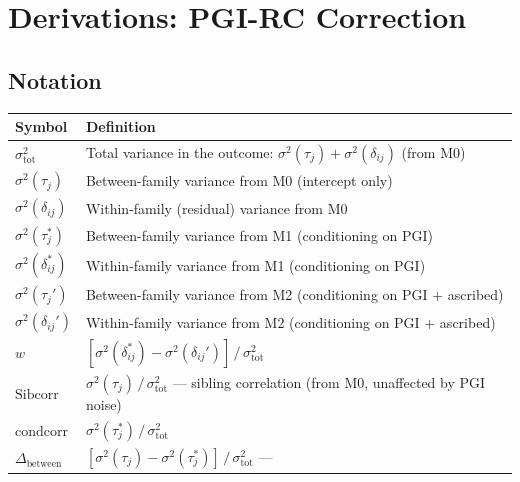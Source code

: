 \documentclass[
]{article}
\author{}
\date{}
\newcounter{none} %
\begin{document}
\section{Derivations: PGI-RC
Correction}\label{derivations-pgi-rc-correction}

\subsection{Notation}\label{notation}

{\def\LTcaptype{none} %
\begin{longtable}[]{@{}
  >{\raggedright\arraybackslash}p{}
  >{\raggedright\arraybackslash}p{}@{}}
\toprule\noalign{}
\begin{minipage}[b]{\linewidth}\raggedright
Symbol
\end{minipage} & \begin{minipage}[b]{\linewidth}\raggedright
Definition
\end{minipage} \\
\midrule\noalign{}
\endhead
\bottomrule\noalign{}
\endlastfoot
\(\sigma^2_\text{tot}\) & Total variance in the outcome:
\(\sigma^2(\tau_j) + \sigma^2(\delta_{ij})\) (from M0) \\
\(\sigma^2(\tau_j)\) & Between-family variance from M0 (intercept
only) \\
\(\sigma^2(\delta_{ij})\) & Within-family (residual) variance from M0 \\
\(\sigma^2(\tau_j^*)\) & Between-family variance from M1 (conditioning
on PGI) \\
\(\sigma^2(\delta_{ij}^*)\) & Within-family variance from M1
(conditioning on PGI) \\
\(\sigma^2(\tau_j')\) & Between-family variance from M2 (conditioning on
PGI + ascribed) \\
\(\sigma^2(\delta_{ij}')\) & Within-family variance from M2
(conditioning on PGI + ascribed) \\
\(w\) &
\([\sigma^2(\delta_{ij}^*) - \sigma^2(\delta_{ij}')]\,/\,\sigma^2_\text{tot}\) \\
\(\text{Sibcorr}\) & \(\sigma^2(\tau_j)\,/\,\sigma^2_\text{tot}\) ---
sibling correlation (from M0, unaffected by PGI noise) \\
\(\text{condcorr}\) & \(\sigma^2(\tau_j^*)\,/\,\sigma^2_\text{tot}\) \\
\(\Delta_\text{between}\) &
\([\sigma^2(\tau_j) - \sigma^2(\tau_j^*)]\,/\,\sigma^2_\text{tot}\) ---

\end{longtable}}
\end{document}

